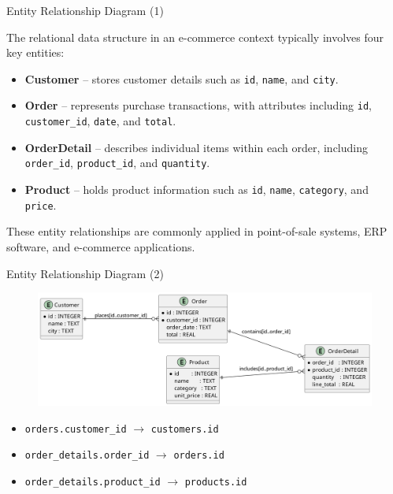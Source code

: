 \documentclass[aspectratio=169, table]{beamer}
\begin{document}
\begin{frame}{Entity Relationship Diagram (1)}
\vspace{20pt}

The relational data structure in an e-commerce context typically involves four key entities:

\begin{itemize}
\item \textbf{Customer} – stores customer details such as \texttt{id}, \texttt{name}, and \texttt{city}.
\item \textbf{Order} – represents purchase transactions, with attributes including \texttt{id}, \texttt{customer\_id}, \texttt{date}, and \texttt{total}.
\item \textbf{OrderDetail} – describes individual items within each order, including \texttt{order\_id}, \texttt{product\_id}, and \texttt{quantity}.
\item \textbf{Product} – holds product information such as \texttt{id}, \texttt{name}, \texttt{category}, and \texttt{price}.
\end{itemize}

These entity relationships are commonly applied in point-of-sale systems, ERP software, and e-commerce applications.

\end{frame}

\begin{frame}{Entity Relationship Diagram (2)}
\vspace{20pt}

\begin{figure}
\centering
\includegraphics[width=\textwidth]{data/out/erd.png}
\label{fig:customer_order_erd}
\end{figure}

\vspace{-30pt}
\begin{itemize}
\item \texttt{orders.customer\_id} $\rightarrow$ \texttt{customers.id}
\item \texttt{order\_details.order\_id} $\rightarrow$ \texttt{orders.id}
\item \texttt{order\_details.product\_id} $\rightarrow$ \texttt{products.id}
\end{itemize}

\end{frame}
\end{document}
